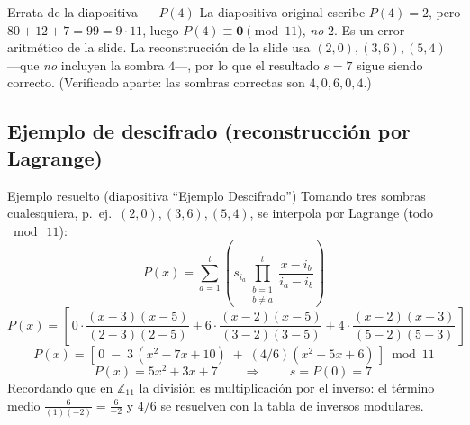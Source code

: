 \documentclass[11pt,a4paper]{article}
\begin{document}
\begin{warnbox}{Errata de la diapositiva — $P(4)$}
La diapositiva original escribe $P(4)=2$, pero $80+12+7=99=9\cdot 11$, luego
$P(4)\equiv \mathbf{0}\pmod{11}$, \emph{no} $2$. Es un error aritmético de la slide. La
reconstrucción de la slide usa $(2,0),(3,6),(5,4)$ —que \emph{no} incluyen la sombra $4$—, por
lo que el resultado $s=7$ sigue siendo correcto. (Verificado aparte: las sombras correctas son
$4,0,6,0,4$.)
\end{warnbox}

\subsection{Ejemplo de descifrado (reconstrucción por Lagrange)}

\begin{practbox}{Ejemplo resuelto (diapositiva ``Ejemplo Descifrado'')}
Tomando tres sombras cualesquiera, p.\ ej.\ $(2,0),(3,6),(5,4)$, se interpola por Lagrange
(todo $\bmod\ 11$):
\[
  P(x) = \sum_{a=1}^{t} \left( s_{i_a} \prod_{\substack{b=1\\ b\neq a}}^{t}
          \frac{x - i_b}{i_a - i_b} \right)
\]
\[
  P(x) = \left[\, 0\cdot\frac{(x-3)(x-5)}{(2-3)(2-5)}
              + 6\cdot\frac{(x-2)(x-5)}{(3-2)(3-5)}
              + 4\cdot\frac{(x-2)(x-3)}{(5-2)(5-3)} \,\right]
\]
\[
  P(x) = \left[\, 0 \;-\; 3\,(x^2-7x+10) \;+\; (4/6)(x^2-5x+6) \,\right] \bmod 11
\]
\[
  P(x) = 5x^2 + 3x + 7 \qquad\Longrightarrow\qquad \boxed{\,s = P(0) = 7\,}
\]
Recordando que en $\mathbb{Z}_{11}$ la división es multiplicación por el inverso: el término
medio $\frac{6}{(1)(-2)} = \frac{6}{-2}$ y $4/6$ se resuelven con la tabla de inversos
modulares.
\end{practbox}
\end{document}

